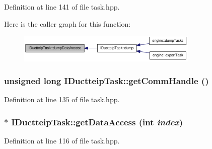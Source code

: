 Definition at line 141 of file task.hpp.

Here is the caller graph for this function:\nopagebreak
\begin{figure}[H]
\begin{center}
\leavevmode
\includegraphics[width=244pt]{class_i_ductteip_task_ab3ea4b7cc3e270b83a4b75655b4efa57_icgraph}
\end{center}
\end{figure}
\hypertarget{class_i_ductteip_task_a9c7685d69efbb5b72a303138dd96521d}{
\subsubsection[{getCommHandle}]{\setlength{\rightskip}{0pt plus 5cm}unsigned long IDuctteipTask::getCommHandle ()}}
\label{class_i_ductteip_task_a9c7685d69efbb5b72a303138dd96521d}


Definition at line 135 of file task.hpp.\hypertarget{class_i_ductteip_task_a403052cd9aa617520ccf192f79b862b9}{
\subsubsection[{getDataAccess}]{$\ast$ IDuctteipTask::getDataAccess (int {\em index})}}
\label{class_i_ductteip_task_a403052cd9aa617520ccf192f79b862b9}


Definition at line 116 of file task.hpp.

